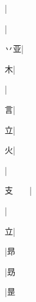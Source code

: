 \begin{multicols}{2}
{{}|{}\par
{\cjk{}{\cnsym{}　}{\cnsym{}　}{\cnsym{}　}}|{}\par
{\cjk{}{\cnsym{}　}丷亚}|{}\par
{\cjk{}{\cnsym{}　}{\cnsym{}　}木}|{}\par
{}|{}\par
{\cjk{}{\cnsym{}　}{\cnsym{}　}言}|{}\par
{\cjk{}{\cnsym{}　}{\cnsym{}　}立}|{}\par
{\cjk{}{\cnsym{}　}{\cnsym{}　}火}|{}\par
{}|{}\par
{\cjk{}支{\cnsym{}　}{\cnsym{}　}}|{}\par
{\cjk{}{\cnsym{}　}{\cnsym{}　}{\cnsym{}　}}|{}\par
{\cjk{}{\cnsym{}　}{\cnsym{}　}立}|{}\par
{\cjk{}{\cnsym{}　}{\cnsym{}　}{\cnsym{}　}}|{\cjk{}昻}\par
{\cjk{}{\cnsym{}　}{\cnsym{}　}{\cnsym{}　}}|{\cjk{}昮}\par
{\cjk{}{\cnsym{}　}{\cnsym{}　}{\cnsym{}　}}|{\cjk{}昰}\par
}
\end{multicols}
